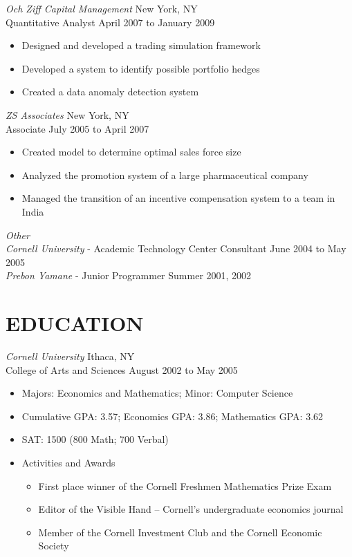 \documentclass{res}
\begin{document}
\begin{resume}
{\sl Och Ziff Capital Management} \hfill New York, NY \\
Quantitative Analyst \hfill   April 2007 to January 2009  
   \begin{itemize} \itemsep -2pt %
   \item Designed and developed a trading simulation framework
   \item Developed a system to identify possible portfolio hedges
   \item Created a data anomaly detection system
 \end{itemize} \vspace{-6pt}

{\sl ZS Associates} \hfill New York, NY \\
Associate \hfill July 2005 to April 2007
 \begin{itemize} \itemsep -2pt
  \item Created model to determine optimal sales force size
  \item Analyzed the promotion system of a large pharmaceutical company
  \item Managed the transition of an incentive compensation system to a team in India
\end{itemize} \vspace{-6pt}

{\sl Other} \\
{\sl Cornell University} - Academic Technology Center Consultant \hfill June 2004 to May 2005 \\
{\sl Prebon Yamane} - Junior Programmer \hfill Summer 2001, 2002 \\
\vspace{-14pt}
 
\section{EDUCATION}
\vspace{1pt}
{\sl Cornell University} \hfill Ithaca, NY \\
College of Arts and Sciences \hfill August 2002 to May 2005
 \begin{itemize} \itemsep -2pt
  \item Majors: Economics and Mathematics; Minor: Computer Science
  \item Cumulative GPA: 3.57; Economics GPA: 3.86; Mathematics GPA: 3.62
  \item SAT: 1500 (800 Math; 700 Verbal)
  \item Activities and Awards \vspace{-6pt}
    \begin{itemize} \itemsep -1pt
    \item First place winner of the Cornell Freshmen Mathematics Prize Exam
    \item Editor of the Visible Hand – Cornell’s undergraduate economics journal
    \item Member of the Cornell Investment Club and the Cornell Economic Society
    \end{itemize} \vspace{0px}
\end{itemize} \vspace{-8pt}


\end{resume}
\end{document}
